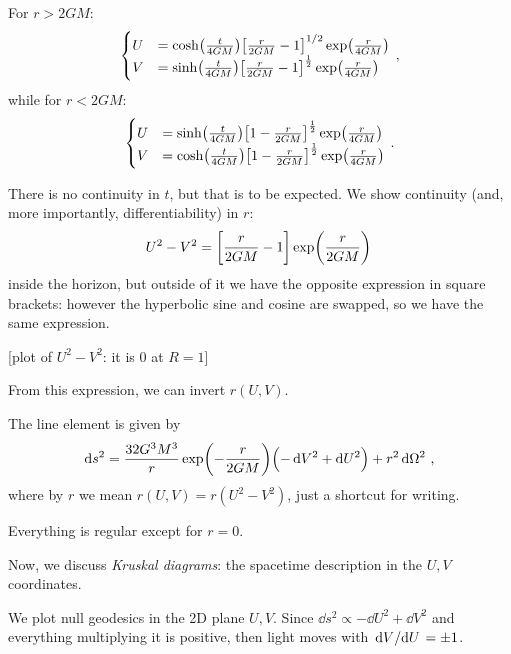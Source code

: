 \documentclass[main.tex]{subfiles}
\begin{document}
For \(r>2GM\):
%
\begin{subequations}
\begin{align}
  \begin{cases}
      U &= \cosh(\frac{t}{4GM} ) \qty[\frac{r}{2GM} - 1]^{1/2} \exp(\frac{r}{4GM})  \\
      V &= \sinh(\frac{t}{4GM}) \qty[\frac{r}{2GM} - 1]^{\frac{1}{2}} \exp(\frac{r}{4GM})
  \end{cases}
\,,
\end{align}
\end{subequations}
%
while for \(r< 2GM\): 
%
\begin{subequations}
\begin{align}
  \begin{cases}
      U &= \sinh(\frac{t}{4GM}) \qty[1 - \frac{r}{2GM}]^{\frac{1}{2}} \exp(\frac{r}{4GM}) \\
      V &= \cosh(\frac{t}{4GM}) \qty[1 - \frac{r}{2GM}]^{\frac{1}{2}} \exp(\frac{r}{4GM}) 
  \end{cases}
\,.
\end{align}
\end{subequations}

There is no continuity in \(t\), but that is to be expected. We show continuity (and, more importantly, differentiability) in \(r\): 
%
\begin{align}
  U^2 - V^2 = \qty[\frac{r}{2GM}- 1] \exp(\frac{r}{2GM})
\,
\end{align}
%
inside the horizon, but outside of it we have the opposite expression in square brackets: however the hyperbolic sine and cosine are swapped, so we have the same expression. 

[plot of \(U^2- V^2\): it is 0 at \(R = 1\)]

From this expression, we can invert \(r ( U, V)\). 

The line element is given by 
%
\begin{align}
  \dd{s^2} = \frac{32G^3M^3}{r} \exp(-\frac{r}{2GM})
  \qty(- \dd{V^2} + \dd{U^2}) + r^2 \dd{\Omega^2}
\,,
\end{align}
%
where by \(r\) we mean \(r(U,V) = r(U^2-V^2)\), just a shortcut for writing.

Everything is regular except for \(r=0\). 

Now, we discuss \emph{Kruskal diagrams}: the spacetime description in the \(U, V\) coordinates. 

We plot null geodesics in the 2D plane \(U, V\). 
Since \(\dd{s^2} \propto - \dd{U^2} + \dd{V^2}\) and everything multiplying it is positive, then light moves with \( \dv*{V}{U} = \pm 1\). 
\end{document}
